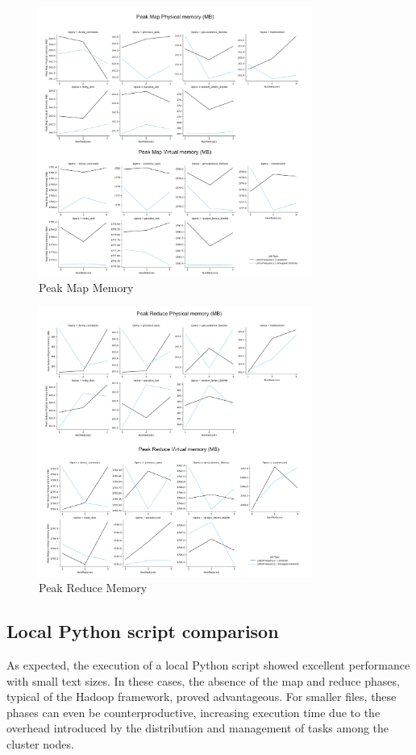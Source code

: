 \begin{figure}[H]
  \centering
  \includegraphics[width=0.8\textwidth]{media/performance/PeakMapMemory.png}
  \caption{Peak Map Memory}
  \label{fig:PeakMapMemory}
\end{figure}

\begin{figure}[H]
  \centering
  \includegraphics[width=0.8\textwidth]{media/performance/PeakReduceMemory.png}
  \caption{Peak Reduce Memory}
  \label{fig:PeakReduceMemory}
\end{figure}

\subsection{Local Python script comparison}
As expected, the execution of a local Python script showed excellent performance with small text sizes. In these cases, the absence of the map and reduce phases, typical of the Hadoop framework, proved advantageous. For smaller files, these phases can even be counterproductive, increasing execution time due to the overhead introduced by the distribution and management of tasks among the cluster nodes.

